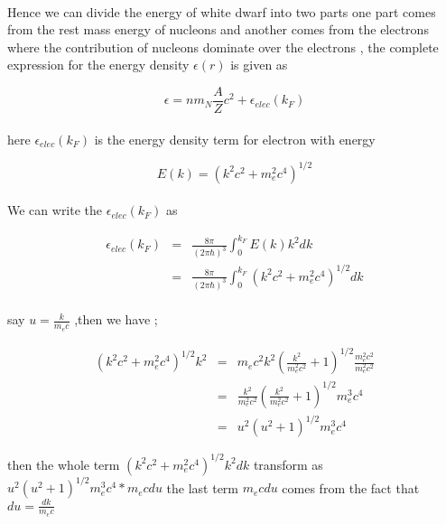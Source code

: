\documentclass{report}
\begin{document}
\paragraph{ }
Hence we can divide the energy of white dwarf into two parts one part comes from the rest mass energy of nucleons and another comes from the electrons where the contribution of nucleons dominate over the electrons , the complete expression for the energy density $\epsilon(r)$ is given as
\begin{center}
\begin{equation}
\epsilon = nm_N \frac{A}{Z}c^2 + \epsilon_{elec}(k_F)
\label{16}
\end{equation}
\end{center}
\paragraph{ }
here $\epsilon_{elec}(k_F)$ is the energy density term for electron with energy 
\begin{center}
\begin{equation}
E(k) = \left(k^2 c^2 + m_e ^2 c^4\right)^{1/2}
\label{17}
\end{equation}
\end{center}
\paragraph{}
We can write the $\epsilon_{elec}(k_F)$ as 
\begin{center}
\begin{eqnarray}
\epsilon_{elec}(k_F) &=& \frac{8\pi}{(2\pi \hbar)^3}\int_0 ^{k_F} E(k)k^2 dk \nonumber \\
	&=& \frac{8\pi}{(2\pi \hbar)^3}\int_0 ^{k_F} \left( k^2 c^2 + m_e ^2 c^4 \right)^{1/2}dk 
\label{18} 
\end{eqnarray}
\end{center}
\paragraph{ }
say  $ u = \frac{k}{m_e c}$  ,then we have ;
\begin{center}
\begin{eqnarray*}
\left( k^2 c^2 + m_e ^2 c^4 \right)^{1/2}k^2 &=& m_e c^2 k^2 \left( \frac{k^2}{m_e ^2 c^2} +1 \right)^{1/2} \frac{m_e ^2 c^2}{m_e ^2 c^2}\\
	&=& \frac{k^2}{m_e ^2 c^2} \left( \frac{k^2}{m_e ^2 c^2} +1 \right)^{1/2} m_e ^3 c^4 \\
	&=& u^2 (u^2 +1)^{1/2} m_e ^3 c^4
\end{eqnarray*}
\end{center}
then the whole term $\left( k^2 c^2 + m_e ^2 c^4 \right)^{1/2}k^2 dk$ 
transform as $u^2 (u^2 +1)^{1/2} m_e ^3 c^4 \ast m_e c du$ the last term $m_e cdu$ comes from the fact that $du= \frac{dk}{m_e c} $
\newpage
\end{document}
